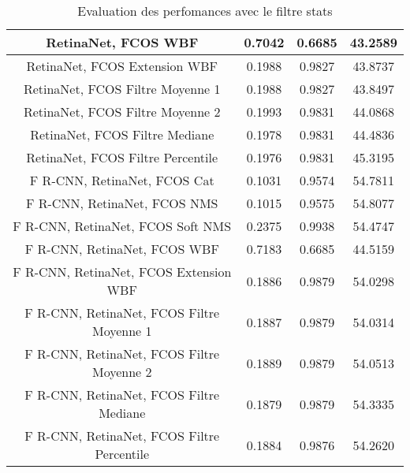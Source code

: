 \documentclass{article}
\begin{document}
\begin{table}[h!]
\begin{tabular}{|c||c|c|c|}
\hline
RetinaNet, FCOS WBF & 0.7042 & 0.6685 & 43.2589 \\ 
\hline
RetinaNet, FCOS Extension WBF & 0.1988 & 0.9827 & 43.8737 \\ 
\hline
RetinaNet, FCOS Filtre Moyenne 1 & 0.1988 & 0.9827 & 43.8497 \\ 
\hline
RetinaNet, FCOS Filtre Moyenne 2 & 0.1993 & 0.9831 & 44.0868 \\ 
\hline
RetinaNet, FCOS Filtre Mediane & 0.1978 & 0.9831 & 44.4836 \\ 
\hline
RetinaNet, FCOS Filtre Percentile & 0.1976 & 0.9831 & 45.3195 \\ 
\hline
F R-CNN, RetinaNet, FCOS Cat & 0.1031 & 0.9574 & 54.7811 \\ 
\hline
F R-CNN, RetinaNet, FCOS NMS & 0.1015 & 0.9575 & 54.8077 \\ 
\hline
F R-CNN, RetinaNet, FCOS Soft NMS & 0.2375 & 0.9938 & 54.4747 \\ 
\hline
F R-CNN, RetinaNet, FCOS WBF & 0.7183 & 0.6685 & 44.5159 \\ 
\hline
F R-CNN, RetinaNet, FCOS Extension WBF & 0.1886 & 0.9879 & 54.0298 \\ 
\hline
F R-CNN, RetinaNet, FCOS Filtre Moyenne 1 & 0.1887 & 0.9879 & 54.0314 \\ 
\hline
F R-CNN, RetinaNet, FCOS Filtre Moyenne 2 & 0.1889 & 0.9879 & 54.0513 \\ 
\hline
F R-CNN, RetinaNet, FCOS Filtre Mediane & 0.1879 & 0.9879 & 54.3335 \\ 
\hline
F R-CNN, RetinaNet, FCOS Filtre Percentile & 0.1884 & 0.9876 & 54.2620 \\ 
\hline
\end{tabular}
\caption{Evaluation des perfomances avec le filtre stats}
\label{table:data}
\end{table}
\end{document}
